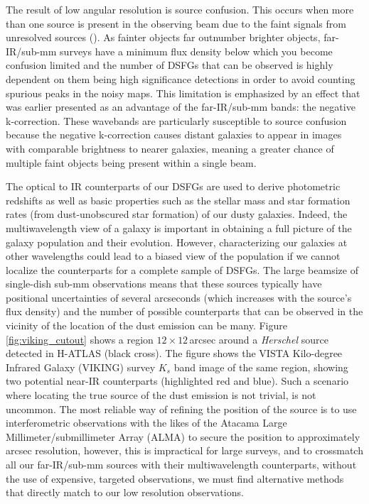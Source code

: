 The result of low angular resolution is source confusion. This occurs when more than one source is present in the observing beam due to the faint signals from unresolved sources (\citealt{Condon_1974}). As fainter objects far outnumber brighter objects, far-IR/sub-mm surveys have a minimum flux density below which you become confusion limited and the number of DSFGs that can be observed is highly dependent on them being high significance detections in order to avoid counting spurious peaks in the noisy maps. This limitation is emphasized by an effect that was earlier presented as an advantage of the far-IR/sub-mm bands: the negative k-correction. These wavebands are particularly susceptible to source confusion because the negative k-correction causes distant galaxies to appear in images with comparable brightness to nearer galaxies, meaning a greater chance of multiple faint objects being present within a single beam.

The optical to IR counterparts of our DSFGs are used to derive photometric redshifts as well as basic properties such as the stellar mass and star formation rates (from dust-unobscured star formation) of our dusty galaxies. Indeed, the multiwavelength view of a galaxy is important in obtaining a full picture of the galaxy population and their evolution. However, characterizing our galaxies at other wavelengths could lead to a biased view of the population if we cannot localize the counterparts for a complete sample of DSFGs. The large beamsize of single-dish sub-mm observations means that these sources typically have positional uncertainties of several arcseconds (which increases with the source's flux density) and the number of possible counterparts that can be observed in the vicinity of the location of the dust emission can be many. Figure \ref{fig:viking_cutout} shows a region $12\times12\,$arcsec around a \textit{Herschel} source detected in H-ATLAS (black cross). The figure shows the VISTA Kilo-degree Infrared Galaxy (VIKING) survey $K_s$ band image of the same region, showing two potential near-IR counterparts (highlighted red and blue). Such a scenario where locating the true source of the dust emission is not trivial, is not uncommon. The most reliable way of refining the position of the source is to use interferometric observations with the likes of the Atacama Large Millimeter/submillimeter Array (ALMA) to secure the position to approximately arcsec resolution, however, this is impractical for large surveys, and to crossmatch all our far-IR/sub-mm sources with their multiwavelength counterparts, without the use of expensive, targeted observations, we must find alternative methods that directly match to our low resolution observations.

